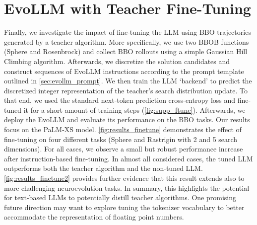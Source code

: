 \documentclass[sigconf]{acmart}
\begin{document}
\section{EvoLLM with Teacher Fine-Tuning}
Finally, we investigate the impact of fine-tuning the LLM using BBO trajectories generated by a teacher algorithm. More specifically, we use two BBOB functions (Sphere and Rosenbrock) and collect BBO rollouts using a simple Gaussian Hill Climbing algorithm. Afterwards, we discretize the solution candidates and construct sequences of EvoLLM instructions according to the prompt template outlined in \cref{sec:evollm_prompt}.
We then train the LLM `backend' to predict the discretized integer representation of the teacher's search distribution update. To that end, we used the standard next-token prediction cross-entropy loss and fine-tuned it for a short amount of training steps (\cref{fig:supp_ftune}). Afterwards, we deploy the EvoLLM and evaluate its performance on the BBO tasks. Our results focus on the PaLM-XS model.
\cref{fig:results_finetune} demonstrates the effect of fine-tuning on four different tasks (Sphere and Rastrigin with 2 and 5 search dimensions). For all cases, we observe a small but robust performance increase after instruction-based fine-tuning. In almost all considered cases, the tuned LLM outperforms both the teacher algorithm and the non-tuned LLM.
\cref{fig:results_finetune2} provides further evidence that this result extends also to more challenging neuroevolution tasks.
In summary, this highlights the potential for text-based LLMs to potentially distill teacher algorithms. One promising future direction may want to explore tuning the tokenizer vocabulary to better accommodate the representation of floating point numbers.
\end{document}
